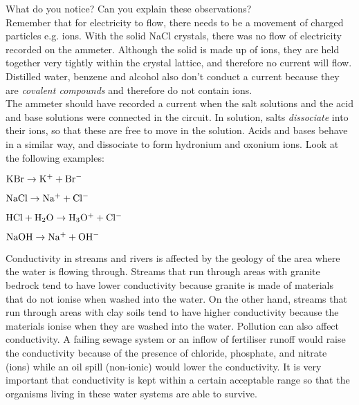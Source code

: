 {{What do you notice? Can you explain these observations?\\

Remember that for electricity to flow, there needs to be a movement of charged particles e.g. ions. With the solid NaCl crystals, there was no flow of electricity recorded on the ammeter. Although the solid is made up of ions, they are held together very tightly within the crystal lattice, and therefore no current will flow. Distilled water, benzene and alcohol also don't conduct a current because they are \textit{covalent compounds} and therefore do not contain ions.\\

The ammeter should have recorded a current when the salt solutions and the acid and base solutions were connected in the circuit. In solution, salts \textit{dissociate} into their ions, so that these are free to move in the solution. Acids and bases behave in a similar way, and dissociate to form hydronium and oxonium ions. Look at the following examples:

\begin{center}

$\rm{KBr \rightarrow K^{+} + Br^{-}}$

$\rm{NaCl \rightarrow Na^{+} + Cl^{-}}$

$\rm{HCl + H_{2}O \rightarrow H_{3}O^{+} + Cl^{-}}$

$\rm{NaOH \rightarrow Na^{+} + OH^{-}}$
\end{center}
}

}

\begin{IFact}{
Conductivity in streams and rivers is affected by the geology of the area where the water is flowing through. Streams that run through areas with granite bedrock tend to have lower conductivity because granite is made of materials that do not ionise when washed into the water. On the other hand, streams that run through areas with clay soils tend to have higher conductivity because the materials ionise when they are washed into the water. Pollution can also affect conductivity. A failing sewage system or an inflow of fertiliser runoff would raise the conductivity because of the presence of chloride, phosphate, and nitrate (ions) while an oil spill (non-ionic) would lower the conductivity. It is very important that conductivity is kept within a certain acceptable range so that the organisms living in these water systems are able to survive. 
}
\end{IFact}


